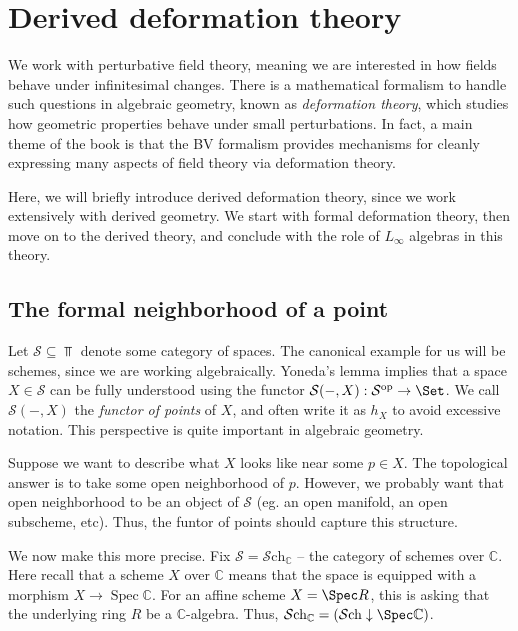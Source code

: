 \section{Derived deformation theory}

We work with perturbative field theory, meaning we are interested in how fields behave under infinitesimal changes. There is a mathematical formalism to handle such questions in algebraic geometry, known as \emph{deformation theory}, which studies how geometric properties behave under small perturbations. In fact, a main theme of the book is that the BV formalism provides mechanisms for cleanly expressing many aspects of field theory via deformation theory.

Here, we will briefly introduce derived deformation theory, since we work extensively with derived geometry. We start with formal deformation theory, then move on to the derived theory, and conclude with the role of $L_\infty $ algebras in this theory.

\subsection{The formal neighborhood of a point}

Let $\mathcal{S} \subseteq \Top $ denote some category of spaces. The canonical example for us will be schemes, since we are working algebraically. Yoneda's lemma implies that a space $X\in \mathcal{S} $ can be fully understood using the functor $\mathcal{S} (-,X): \mathcal{S} ^{\mathrm{op}}  \to \Set $. We call $\mathcal{S} (-,X)$  the \emph{functor of points} of $X$, and often write it as $h_X$ to avoid excessive notation. This perspective is quite important in algebraic geometry.

Suppose we want to describe what $X$ looks like near some $p\in X$. The topological answer is to take some open neighborhood of $p$. However, we probably want that open neighborhood to be an object of $\mathcal{S} $ (eg. an open manifold, an open subscheme, etc). Thus, the funtor of points should capture this structure.

We now make this more precise. Fix $\mathcal{S} =\mathcal{S} \mathrm{ch}_{\mathbb{C} } $ -- the category of schemes over $\mathbb{C} $. Here recall that a scheme $X$ over $\mathbb{C} $ means that the space is equipped with a morphism $X \to \operatorname{Spec} \mathbb{C} $. For an affine scheme $X=\Spec R$, this is asking that the underlying ring $R$ be a $\mathbb{C} $-algebra. Thus, $\mathcal{S} \mathrm{ch}_\mathbb{C} =(\mathcal{S} \mathrm{ch} \downarrow\Spec\mathbb{C} )$.

